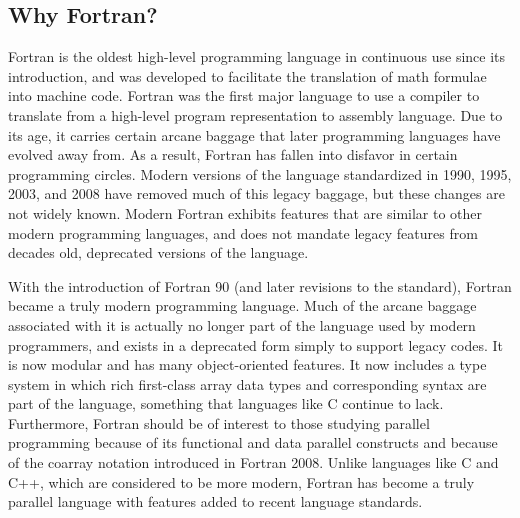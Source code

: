 

\subsection{Why Fortran?}

Fortran 
is the oldest
high-level programming language in continuous use since its
introduction, and was developed to facilitate the translation of math
formulae into machine code. Fortran was the first major language to
use a compiler to translate from a high-level program representation
to assembly language. Due to its age, it carries certain arcane
baggage that later programming languages have evolved away from. As a
result, Fortran has fallen into disfavor in certain programming
circles.  Modern versions of the language standardized in 1990, 1995, 2003, and 2008
have removed much of this legacy baggage, but these changes are not
widely known.  Modern Fortran exhibits features that are similar to 
other modern programming languages, and does not mandate legacy features
from decades old, deprecated versions of the language.

With the introduction of Fortran 90 (and later revisions to the
standard), Fortran became a truly modern programming language. Much of
the arcane baggage associated with it is actually no longer part of
the language used by modern programmers, and exists in a deprecated
form simply to support legacy codes. It is now modular and has many
object-oriented features.  It now includes a type system in which rich
first-class array data types and corresponding syntax are part of the
language, something that languages like C continue to lack.
Furthermore, Fortran should be of interest to those studying parallel
programming because of its functional and data parallel constructs and
because of the coarray notation introduced in Fortran 2008. Unlike
languages like C and C++, which are considered to be more modern,
Fortran has become a truly parallel language with features added to
recent language standards.

